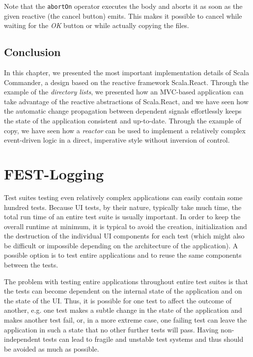 Note that the \texttt{abortOn} operator executes the body and aborts it as soon as the given reactive (the cancel button) emits. This makes it possible to cancel while waiting for the \emph{OK} button or while actually copying the files.


\section{Conclusion}

In this chapter, we presented the most important implementation details of Scala Commander, a design based on the reactive framework Scala.React. Through the example of the \emph{directory lists}, we presented how an MVC-based application can take advantage of the reactive abstractions of Scala.React, and we have seen how the automatic change propagation between dependent signals effortlessly keeps the state of the application consistent and up-to-date. Through the example of copy, we have seen how a \emph{reactor} can be used to implement a relatively complex event-driven logic in a direct, imperative style without inversion of control. 

	


\chapter{FEST-Logging}\label{chap:impl_fest-logging}

Test suites testing even relatively complex applications can easily contain some hundred tests. Because UI tests, by their nature, typically take much time, the total run time of an entire test suite is usually important. In order to keep the overall runtime at minimum, it is typical to avoid the creation, initialization and the destruction of the individual UI components for each test (which might also be difficult or impossible depending on the architecture of the application). A possible option is to test entire applications and to reuse the same components between the tests.

The problem with testing entire applications throughout entire test suites is that the tests can become dependent on the internal state of the application and on the state of the UI. Thus, it is possible for one test to affect the outcome of another, e.g. one test makes a subtle change in the state of the application and makes another test fail, or, in a more extreme case, one failing test can leave the application in such a state that no other further tests will pass. Having non-independent tests can lead to fragile and unstable test systems and thus should be avoided as much as possible.

